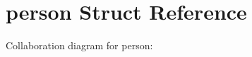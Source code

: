 \hypertarget{structperson}{}\section{person Struct Reference}
\label{structperson}


Collaboration diagram for person\+:
